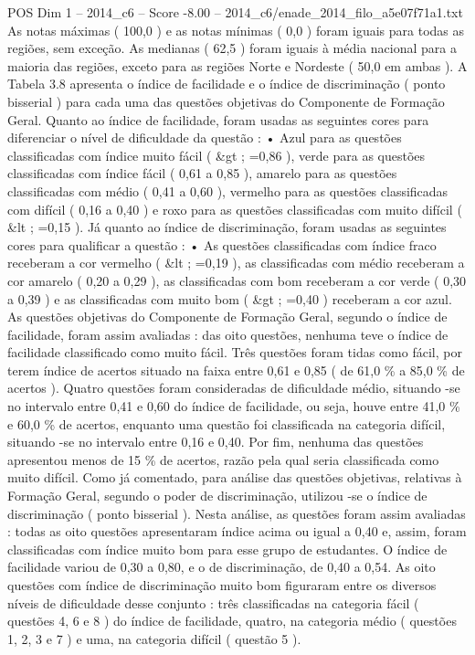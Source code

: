 \begin{textsample}{POS Dim 1 – 2014\_c6 – Score -8.00 – 2014\_c6/enade\_2014\_filo\_a5e07f71a1.txt}
As notas máximas ( 100,0 ) e as notas mínimas ( 0,0 ) foram iguais para todas as regiões, sem exceção.
As medianas ( 62,5 ) foram iguais à média nacional para a maioria das regiões, exceto para as regiões Norte e Nordeste ( 50,0 em ambas ).
A Tabela 3.8 apresenta o índice de facilidade e o índice de discriminação ( ponto bisserial ) para cada uma das questões objetivas do Componente de Formação Geral.
Quanto ao índice de facilidade, foram usadas as seguintes cores para diferenciar o nível de dificuldade da questão : • Azul para as questões classificadas com índice muito fácil ( \&gt ; =0,86 ), verde para as questões classificadas com índice fácil ( 0,61 a 0,85 ), amarelo para as questões classificadas com médio ( 0,41 a 0,60 ), vermelho para as questões classificadas com difícil ( 0,16 a 0,40 ) e roxo para as questões classificadas com muito difícil ( \&lt ; =0,15 ).
Já quanto ao índice de discriminação, foram usadas as seguintes cores para qualificar a questão : • As questões classificadas com índice fraco receberam a cor vermelho ( \&lt ; =0,19 ), as classificadas com médio receberam a cor amarelo ( 0,20 a 0,29 ), as classificadas com bom receberam a cor verde ( 0,30 a 0,39 ) e as classificadas com muito bom ( \&gt ; =0,40 ) receberam a cor azul.
As questões objetivas do Componente de Formação Geral, segundo o índice de facilidade, foram assim avaliadas : das oito questões, nenhuma teve o índice de facilidade classificado como muito fácil.
Três questões foram tidas como fácil, por terem índice de acertos situado na faixa entre 0,61 e 0,85 ( de 61,0 \% a 85,0 \% de acertos ).
Quatro questões foram consideradas de dificuldade médio, situando -se no intervalo entre 0,41 e 0,60 do índice de facilidade, ou seja, houve entre 41,0 \% e 60,0 \% de acertos, enquanto uma questão foi classificada na categoria difícil, situando -se no intervalo entre 0,16 e 0,40.
Por fim, nenhuma das questões apresentou menos de 15 \% de acertos, razão pela qual seria classificada como muito difícil.
Como já comentado, para análise das questões objetivas, relativas à Formação Geral, segundo o poder de discriminação, utilizou -se o índice de discriminação ( ponto bisserial ).
Nesta análise, as questões foram assim avaliadas : todas as oito questões apresentaram índice acima ou igual a 0,40 e, assim, foram classificadas com índice muito bom para esse grupo de estudantes.
O índice de facilidade variou de 0,30 a 0,80, e o de discriminação, de 0,40 a 0,54.
As oito questões com índice de discriminação muito bom figuraram entre os diversos níveis de dificuldade desse conjunto : três classificadas na categoria fácil ( questões 4, 6 e 8 ) do índice de facilidade, quatro, na categoria médio ( questões 1, 2, 3 e 7 ) e uma, na categoria difícil ( questão 5 ).

\end{textsample}
